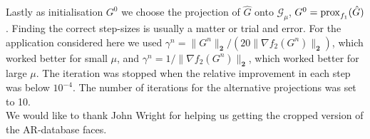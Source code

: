 \documentclass[11pt]{article}
\begin{document}
Lastly as initialisation $G^0$ we choose the projection of $\hat{G}$ onto $\mathcal{G}_\mu$, \ie $G^0={\operatorname{prox}}_{f_1}(\hat{G})$. Finding the correct step-sizes is usually a matter or trial and error. For the application considered here we used $\gamma^n= \|G^n\|_\mathbf{2}/(20 \|\nabla f_2(G^n)\|_\mathbf{2})$, which worked better for small $\mu$, and $\gamma^n= 1/ \|\nabla f_2(G^n)\|_\mathbf{2}$, which worked better for large $\mu$. The iteration was stopped when the relative improvement in each step was below $10^{-4}$. The number of iterations for the alternative projections was set to 10. \\

 We would like to thank John Wright for helping us getting the cropped version of the AR-database faces.



\end{document}
